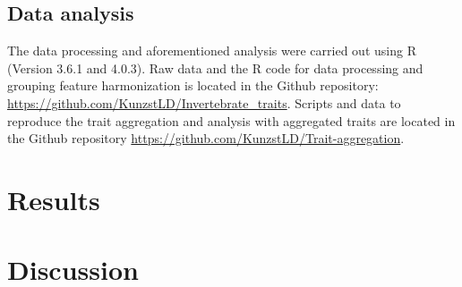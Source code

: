 \documentclass{article}
\begin{document}

\subsection*{Data analysis}

The data processing and aforementioned analysis were carried out using R (Version 3.6.1 and 4.0.3). Raw data and the R code for data processing and grouping feature harmonization is located in the Github repository: \url{https://github.com/KunzstLD/Invertebrate_traits}. Scripts and data to reproduce the trait aggregation and analysis with aggregated traits are located in the Github repository \url{https://github.com/KunzstLD/Trait-aggregation}.


\newpage
\section*{Results}



\newpage 


\newpage 


\newpage 




\section*{Discussion}

\end{document}
